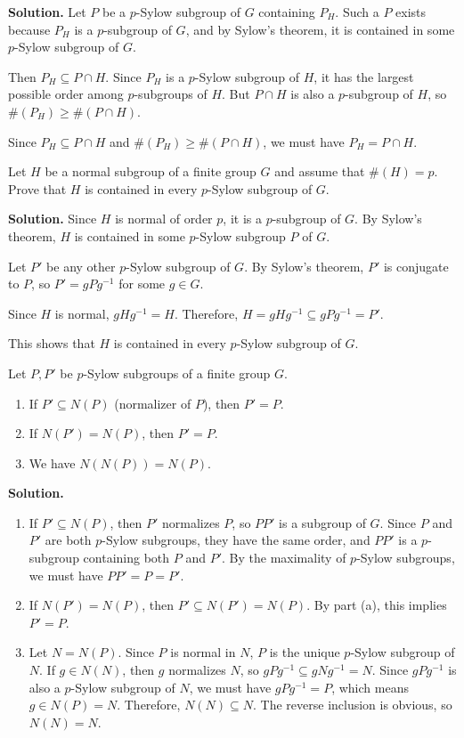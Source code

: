 \noindent\textbf{Solution.} Let $P$ be a $p$-Sylow subgroup of $G$ containing $P_H$. Such a $P$ exists because $P_H$ is a $p$-subgroup of $G$, and by Sylow's theorem, it is contained in some $p$-Sylow subgroup of $G$.

Then $P_H \subseteq P \cap H$. Since $P_H$ is a $p$-Sylow subgroup of $H$, it has the largest possible order among $p$-subgroups of $H$. But $P \cap H$ is also a $p$-subgroup of $H$, so $\#(P_H) \geq \#(P \cap H)$.

Since $P_H \subseteq P \cap H$ and $\#(P_H) \geq \#(P \cap H)$, we must have $P_H = P \cap H$.

\begin{problembox}
Let $H$ be a normal subgroup of a finite group $G$ and assume that $\#(H) = p$. Prove that $H$ is contained in every $p$-Sylow subgroup of $G$.
\end{problembox}

\noindent\textbf{Solution.} Since $H$ is normal of order $p$, it is a $p$-subgroup of $G$. By Sylow's theorem, $H$ is contained in some $p$-Sylow subgroup $P$ of $G$.

Let $P'$ be any other $p$-Sylow subgroup of $G$. By Sylow's theorem, $P'$ is conjugate to $P$, so $P' = gPg^{-1}$ for some $g \in G$.

Since $H$ is normal, $gHg^{-1} = H$. Therefore, $H = gHg^{-1} \subseteq gPg^{-1} = P'$.

This shows that $H$ is contained in every $p$-Sylow subgroup of $G$.

\begin{problembox}
Let $P, P'$ be $p$-Sylow subgroups of a finite group $G$.
\begin{enumerate}[label=(\alph*)]
\item If $P' \subseteq N(P)$ (normalizer of $P$), then $P' = P$.
\item If $N(P') = N(P)$, then $P' = P$.
\item We have $N(N(P)) = N(P)$.
\end{enumerate}
\end{problembox}

\noindent\textbf{Solution.}
\begin{enumerate}[label=(\alph*)]
\item If $P' \subseteq N(P)$, then $P'$ normalizes $P$, so $PP'$ is a subgroup of $G$. Since $P$ and $P'$ are both $p$-Sylow subgroups, they have the same order, and $PP'$ is a $p$-subgroup containing both $P$ and $P'$. By the maximality of $p$-Sylow subgroups, we must have $PP' = P = P'$.

\item If $N(P') = N(P)$, then $P' \subseteq N(P') = N(P)$. By part (a), this implies $P' = P$.

\item Let $N = N(P)$. Since $P$ is normal in $N$, $P$ is the unique $p$-Sylow subgroup of $N$. If $g \in N(N)$, then $g$ normalizes $N$, so $gPg^{-1} \subseteq gNg^{-1} = N$. Since $gPg^{-1}$ is also a $p$-Sylow subgroup of $N$, we must have $gPg^{-1} = P$, which means $g \in N(P) = N$. Therefore, $N(N) \subseteq N$. The reverse inclusion is obvious, so $N(N) = N$.
\end{enumerate}

